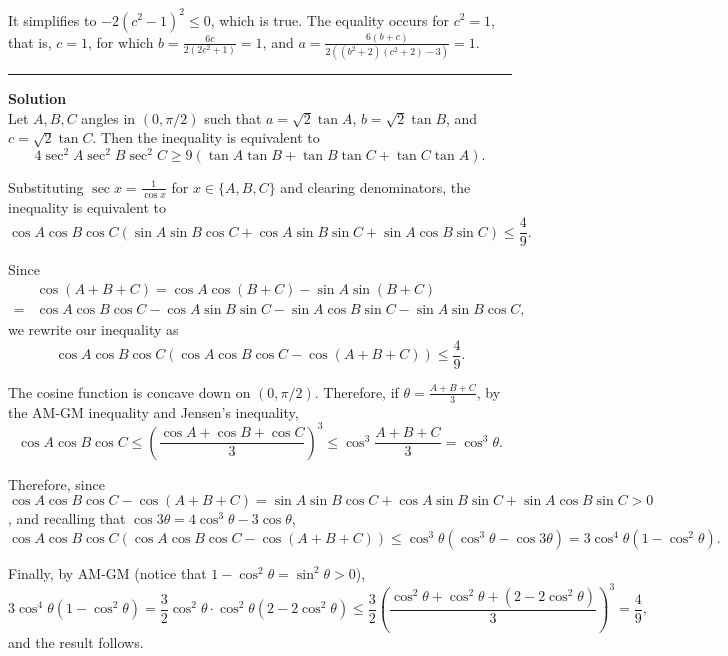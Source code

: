 \documentclass[12pt,oneside,a4paper]{book}
\newcounter{solnum}
\newcommand{\soln}{\stepcounter{solnum}\medskip\hrule\medbreak\textbf{Solution \thesolnum}\\}
\begin{document}
It simplifies to $-2(c^2-1)^2 \le 0$, which is true. The equality occurs for $c^2=1$, that is, $c=1$, for which $b = \frac{6c}{2(2c^2+1)} = 1$, and $a = \frac{6(b+c)}{2((b^2+2)(c^2+2)-3)} = 1$.

\soln
Let $A,B,C$ angles in $(0,\pi/2)$ such that $a = \sqrt 2\tan A$, $b = \sqrt 2\tan B$, and $c = \sqrt 2\tan C$. Then the inequality is equivalent to
\[4\sec^2A\sec^2B\sec^2C \ge 9(\tan A\tan B + \tan B\tan C + \tan C\tan A).\]

Substituting $\sec x = \frac1{\cos x}$ for $x\in\{A,B,C\}$ and clearing denominators, the inequality is equivalent to
\[\cos A\cos B\cos C(\sin A\sin B\cos C + \cos A\sin B\sin C + \sin A\cos B\sin C) \le \frac49.\]

Since
\begin{align*}
&\cos(A+B+C) = \cos A\cos(B+C) - \sin A\sin(B+C)\\
{}={}& \cos A\cos B\cos C - \cos A\sin B\sin C - \sin A\cos B\sin C - \sin A\sin B\cos C,
\end{align*}
we rewrite our inequality as
\[\cos A\cos B\cos C(\cos A\cos B\cos C - \cos(A+B+C)) \le \frac49.\]

The cosine function is concave down on $(0,\pi/2)$. Therefore, if $\theta = \frac{A+B+C}3$, by the AM-GM inequality and Jensen's inequality,
\[\cos A\cos B\cos C \le \left(\frac{\cos A + \cos B + \cos C}3\right)^3 \le \cos^3\frac{A+B+C}3 = \cos^3\theta.\]

Therefore, since $\cos A\cos B\cos C - \cos(A+B+C) = \sin A\sin B\cos C + \cos A\sin B\sin C + \sin A\cos B\sin C > 0$, and recalling that $\cos3\theta = 4\cos^3\theta-3\cos\theta$,
\[\cos A\cos B\cos C(\cos A\cos B\cos C - \cos(A+B+C)) \le \cos^3\theta(\cos^3\theta - \cos3\theta)
= 3\cos^4\theta(1-\cos^2\theta).\]

Finally, by AM-GM (notice that $1-\cos^2\theta = \sin^2\theta > 0$),
\[3\cos^4\theta(1-\cos^2\theta) = \frac32\cos^2\theta\cdot \cos^2\theta(2-2\cos^2\theta) \le \frac32\left(\frac{\cos^2\theta + \cos^2\theta + (2-2\cos^2\theta)}3\right)^3 = \frac49,\]
and the result follows.
\end{document}

